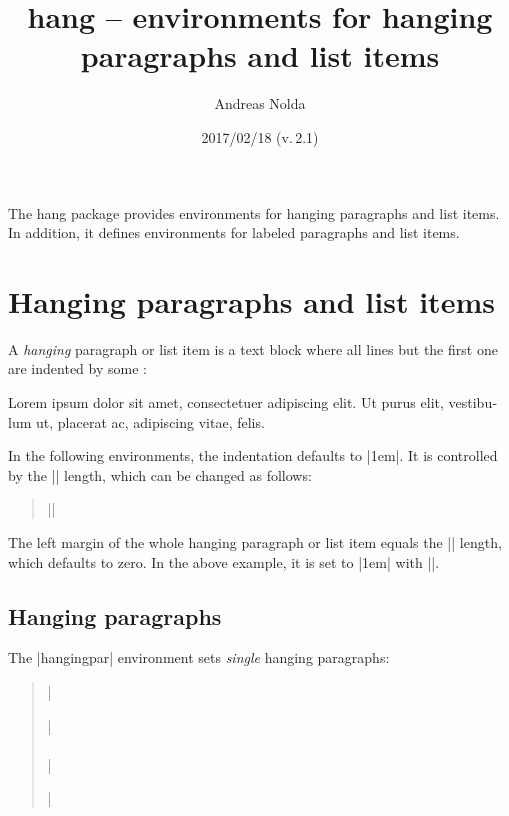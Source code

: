\documentclass[a4paper]{ltxdoc}
\newenvironment{hangingexample}{\medskip\setlength{\hangingleftmargin}{1em}}{\medskip}
\newcommand{\lipsum}{\textlatin{Lorem ipsum dolor sit amet, consectetuer
adipiscing elit. Ut purus elit, vestibulum ut, placerat ac, adipiscing vitae, felis.}}
\begin{document}
\title{\textsf{hang} -- environments for hanging \\
paragraphs and list items}
\author{Andreas Nolda}
\date{2017/02/18 (v.\,2.1)}
\maketitle

\noindent The \textsf{hang} package provides environments for hanging paragraphs
and list items. In addition, it defines environments for labeled paragraphs and
list items.

\section{Hanging paragraphs and list items}

A \emph{hanging} paragraph or list item is a text block where all lines but the
first one are indented by some :

\begin{hangingexample}
\begin{hangingpar}
\lipsum
\end{hangingpar}
\end{hangingexample}

\DescribeMacro{\hangingindent} In the following environments, the indentation
 defaults to |1em|. It is controlled by the |\hangingindent|
length, which can be changed as follows: \begin{quote}
||
\end{quote}

\DescribeMacro{\hangingleftmargin} The left margin of the whole hanging
paragraph or list item equals the |\hangingleftmargin| length, which defaults to
zero. In the above example, it is set to |1em| with |\setlength|.

\subsection{Hanging paragraphs}

 The |hangingpar| environment sets \emph{single}
hanging paragraphs:
\begin{quote}
|\begin{hangingpar}| \\
 \\
|\end{hangingpar}|
\end{quote}
\end{document}
